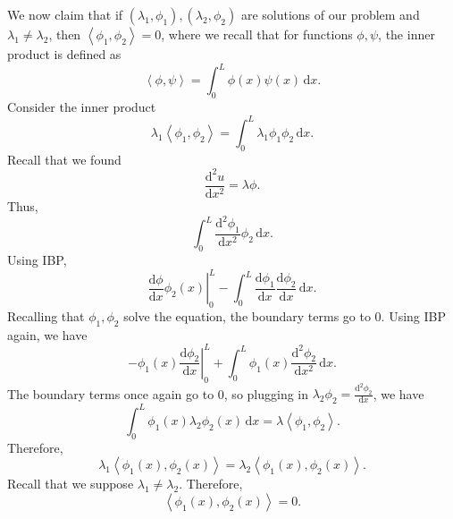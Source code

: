 We now claim that if $(\lambda _1,\phi _1),(\lambda _2,\phi _2)$ are solutions of our problem and $\lambda _1\neq \lambda _2$, then $\left<\phi_1,\phi _2 \right> =0$, where we recall that for functions $\phi ,\psi $, the inner product is defined as
\[
	\left<\phi ,\psi  \right> =\int_{0}^{L} \phi (x)\psi (x) \,\mathrm{d} x
.\]
Consider the inner product
\[
	\lambda _1\left<\phi_1,\phi _2\right> =\int_{0}^{L} \lambda_1\phi_1\phi _2 \,\mathrm{d} x
.\]
Recall that we found
\[
	\frac{\mathrm{d}^2u}{\mathrm{d}x^2} =\lambda \phi 
.\]
Thus,
\[
	\int_{0}^{L} \frac{\mathrm{d}^2\phi_1 }{\mathrm{d}x^2} \phi _2 \,\mathrm{d} x
.\]
Using IBP,
\[
	\left. \frac{\mathrm{d}\phi }{\mathrm{d}x} \phi _2(x)\right|_{0}^{L}-\int_{0}^{L} \frac{\mathrm{d}\phi _1}{\mathrm{d}x} \frac{\mathrm{d}\phi _2}{\mathrm{d}x}  \,\mathrm{d} x
.\]
Recalling that $\phi_1,\phi _2$ solve the equation, the boundary terms go to 0. Using IBP again, we have
\[
	\left. -\phi _1(x)\frac{\mathrm{d}\phi _2}{\mathrm{d}x} \right|_{0}^{L}+\int_{0}^{L} \phi _1(x)\frac{\mathrm{d}^2\phi _2}{\mathrm{d}x^2}  \,\mathrm{d} x
.\]
The boundary terms once again go to 0, so plugging in $\lambda _2\phi _2=\frac{\mathrm{d}^2\phi_2 }{\mathrm{d}x} $, we have
\[
	\int_{0}^{L} \phi _1(x)\lambda_2\phi _2(x) \,\mathrm{d} x=\lambda \left<\phi _1,\phi _2 \right>
.\]
Therefore,
\[
	\lambda _1 \left<\phi _1(x),\phi _2(x) \right> =\lambda _2\left<\phi _1(x),\phi _2(x) \right>
.\]
Recall that we suppose $\lambda _1\neq \lambda _2$. Therefore,
\[
	\left<\phi _1(x),\phi _2(x) \right> =0
.\]

